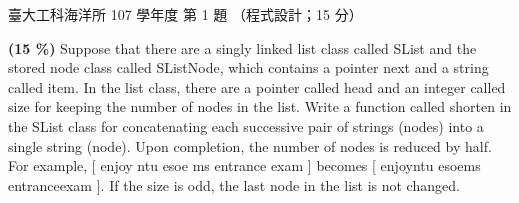 \begin{pastexam}[label={px:ntu-107-esoe-ds-01}]{臺大工科海洋所 107 學年度 第 1 題}
（程式設計；15 分）

\textbf{(15 \%)} Suppose that there are a singly linked list class called \textsf{SList} and the
stored node class called \textsf{SListNode}, which contains a pointer \textsf{next} and a string
called \textsf{item}. In the list class, there are a pointer called \textsf{head} and an integer
called \textsf{size} for keeping the number of nodes in the list. Write a function called
\textsf{shorten} in the \textsf{SList} class for concatenating each successive pair of strings
(nodes) into a single string (node). Upon completion, the number of nodes is reduced by half. For
example, [ enjoy ntu esoe ms entrance exam ] becomes [ enjoyntu esoems entranceexam ]. If the size
is odd, the last node in the list is not changed.
\end{pastexam}

